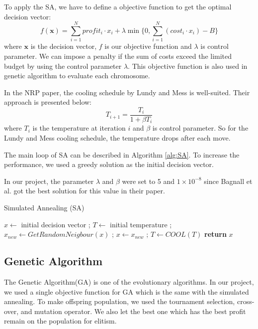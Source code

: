 To apply the SA, we have to define a objective function to get the optimal decision vector:
\[
f(\textbf{x}) = \sum_{i = 1}^{N} profit_i \cdot x_i + \lambda \min \Big\{0, \sum_{i = 1}^{N} (cost_i \cdot x_i) - B \Big\}
\]
where $\textbf{x}$ is the decision vector, $f$ is our objective function and $\lambda$ is control parameter. We can impose a penalty if the sum of costs exceed the limited budget by using the control parameter $\lambda$. This objective function is also used in genetic algorithm to evaluate each chromosome.

In the NRP paper\cite{NRP}, the cooling schedule by Lundy and Mess\cite{LundySA} is well-suited. Their approach is presented below:
\[
    T_{i+1} = \frac{T_i}{1 + \beta T_i}
\]
where $T_i$ is the temperature at iteration $i$ and $\beta$ is control parameter. So for the Lundy and Mess cooling schedule, the temperature drops after each move.

The main loop of SA can be described in Algorithm \ref{alg:SA}. To increase the performance, we used a greedy solution as the initial decision vector. 

In our project, the parameter $\lambda$ and $\beta$ were set to 5 and $1 \times 10^{-8}$ since Bagnall et al. got the best solution for this value in their paper.


\begin{algorithm}
\caption{Simulated Annealing (SA)}\label{alg:SA}
\begin{algorithmic}
    \State $x \gets$ initial decision vector ;
    \State $T \gets$ initial temperature ; 
        \State $x_{new} \gets GetRandomNeigbour(x)$ ;
            \State $x \gets x_{new}$ ;
        \EndIf
        \State $T \gets COOL(T)$ 
    \EndWhile
    \textbf{return} $x$
\end{algorithmic}
\end{algorithm}

\subsection{Genetic Algorithm}
The Genetic Algorithm(GA) is one of the evolutionary algorithms. In our project, we used a single objective function for GA which is the same with the simulated annealing. To make offspring population, we used the tournament selection, cross-over, and mutation operator. We also let the best one which has the best profit remain on the population for elitism.

